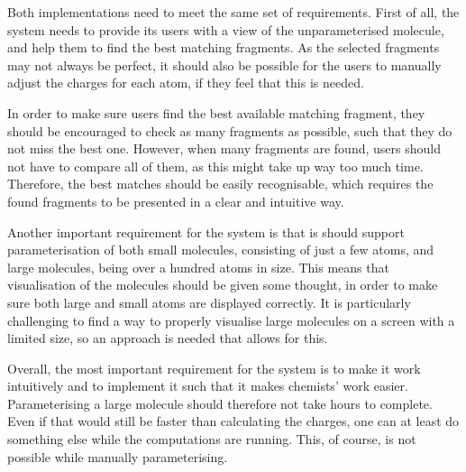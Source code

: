 Both implementations need to meet the same set of requirements. First of all, the system needs to provide its users with a view of the unparameterised molecule, and help them to find the best matching fragments. As the selected fragments may not always be perfect, it should also be possible for the users to manually adjust the charges for each atom, if they feel that this is needed.

In order to make sure users find the best available matching fragment, they should be encouraged to check as many fragments as possible, such that they do not miss the best one. However, when many fragments are found, users should not have to compare all of them, as this might take up way too much time. Therefore, the best matches should be easily recognisable, which requires the found fragments to be presented in a clear and intuitive way.

Another important requirement for the system is that is should support parameterisation of both small molecules, consisting of just a few atoms, and large molecules, being over a hundred atoms in size. This means that visualisation of the molecules should be given some thought, in order to make sure both large and small atoms are displayed correctly. It is particularly challenging to find a way to properly visualise large molecules on a screen with a limited size, so an approach is needed that allows for this.

Overall, the most important requirement for the system is to make it work intuitively and to implement it such that it makes chemists' work easier. Parameterising a large molecule should therefore not take hours to complete. Even if that would still be faster than calculating the charges, one can at least do something else while the computations are running. This, of course, is not possible while manually parameterising.
